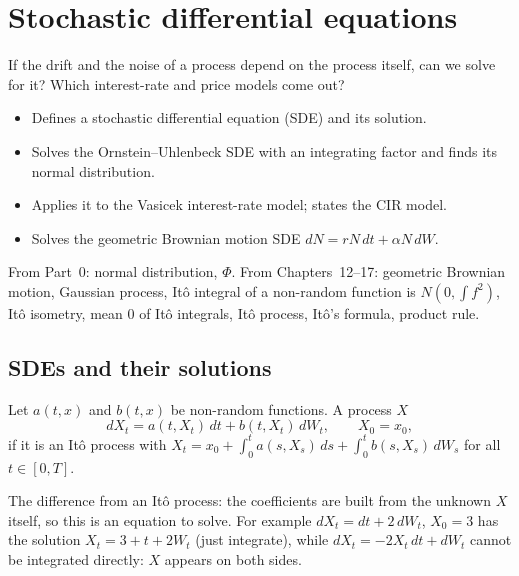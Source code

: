 \chapter{Stochastic differential equations}
\label{ch:sde}

\begin{question}
If the drift and the noise of a process depend on the process itself, can we solve for it? Which interest-rate and price models come out?
\end{question}

\begin{whatfor}
\begin{itemize}
  \item Defines a stochastic differential equation (SDE) and its solution.
  \item Solves the Ornstein--Uhlenbeck SDE with an integrating factor and finds its normal distribution.
  \item Applies it to the Vasicek interest-rate model; states the CIR model.
  \item Solves the geometric Brownian motion SDE $dN=rN\,dt+\alpha N\,dW$.
\end{itemize}
\end{whatfor}

\begin{prereq}
From Part~0: normal distribution, $\Phi$. From Chapters~12--17: geometric Brownian motion, Gaussian process, Itô integral of a non-random function is $N(0,\int f^2)$, Itô isometry, mean $0$ of Itô integrals, Itô process, Itô's formula, product rule.
\end{prereq}

\section{SDEs and their solutions}

\begin{definition}
\label{def:sde}
Let $a(t,x)$ and $b(t,x)$ be non-random functions. A process $X$ 
\[
  dX_t=a(t,X_t)\,dt+b(t,X_t)\,dW_t,\qquad X_0=x_0,
\]
if it is an Itô process with $X_t=x_0+\int_0^ta(s,X_s)\,ds+\int_0^tb(s,X_s)\,dW_s$ for all $t\in[0,T]$.
\end{definition}

The difference from an Itô process: the coefficients are built from the unknown $X$ itself, so this is an equation to solve. For example $dX_t=dt+2\,dW_t$, $X_0=3$ has the solution $X_t=3+t+2W_t$ (just integrate), while $dX_t=-2X_t\,dt+dW_t$ cannot be integrated directly: $X$ appears on both sides.

